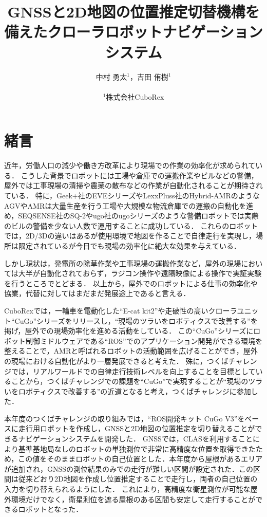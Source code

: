 \documentclass[platex,dvipdfmx]{rbproceedings}
\title{GNSSと2D地図の位置推定切替機構を備えたクローラロボットナビゲーションシステム}
\author{%
中村 勇太${}^{1}$，吉田 侑樹${}^{1}$\\ \\
${}^{1}$株式会社CuboRex
}
\begin{document}
\maketitle


\section{緒言}
近年，労働人口の減少や働き方改革により現場での作業の効率化が求められている．
こうした背景でロボットには工場や倉庫での運搬作業やビルなどの警備，屋外では工事現場の清掃や農薬の散布などの作業が自動化されることが期待されている．
特に，Geek+社のEVEシリーズ\cite{geek_plus}やLexxPluss社のHybrid-AMR\cite{lexxpluss}のようなAGVやAMRは大量生産を行う工場や大規模な物流倉庫での運搬の自動化を進め，SEQSENSE社のSQ-2\cite{seqsense}やugo社のugoシリーズ\cite{ugo}のような警備ロボットでは実際のビルの警備を少ない人数で運用することに成功している．
これらのロボットでは，2D/3Dの違いはあるが使用環境で地図を作ることで自律走行を実現し，場所は限定されているが今日でも現場の効率化に絶大な効果を与えている．

しかし現状は，発電所の除草作業や工事現場の運搬作業など，屋外の現場においては大半が自動化されておらず，ラジコン操作や遠隔映像による操作で実証実験を行うところでとどまる．
以上から，屋外でのロボットによる仕事の効率化や協業，代替に対してはまだまだ発展途上であると言える．

CuboRexでは，一輪車を電動化した“E-cat kit2”\cite{e_cat}や走破性の高いクローラユニット“CuGo”シリーズ\cite{cugo}をリリースし，“現場のツラいをロボティクスで改善する”を掲げ，屋外での現場効率化を進める活動をしている．
この“CuGo”シリーズにロボット制御ミドルウェアである“ROS”でのアプリケーション開発ができる環境を整えることで，AMRと呼ばれるロボットの活動範囲を広げることができ，屋外の現場における自動化がより一層発展できると考えた．
殊に，つくばチャレンジでは，リアルワールドでの自律走行技術レベルを向上することを目標としていることから，つくばチャレンジでの課題を“CuGo”で実現することが“現場のツラいをロボティクスで改善する”の近道となると考え，つくばチャレンジに参加した．

本年度のつくばチャレンジの取り組みでは，“ROS開発キット CuGo V3”\cite{cugo_ros}をベースに走行用ロボットを作成し，GNSSと2D地図の位置推定を切り替えることができるナビゲーションシステムを開発した．
GNSSでは，CLAS\cite{clas}を利用することにより基準基地局なしのロボットの単独測位で非常に高精度な位置を取得できたため，この値をそのままロボットの自己位置とした．本年度から屋根があるエリアが追加され，GNSSの測位結果のみでの走行が難しい区間が設定された．この区間は従来どおり2D地図を作成し位置推定することで走行し，両者の自己位置の入力を切り替えられるようにした．
これにより，高精度な衛星測位が可能な屋外環境だけでなく，衛星測位を遮る屋根のある区間も安定して走行することができるロボットとなった．
\end{document}
